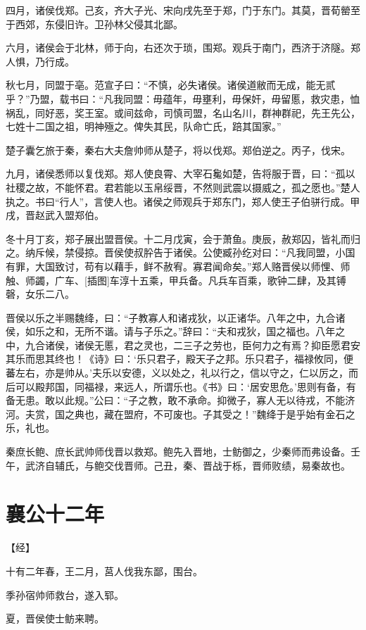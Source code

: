 \documentclass[a4paper,12pt,UTF8,twoside]{ctexbook}
\begin{document}
四月，诸侯伐郑。己亥，齐大子光、宋向戌先至于郑，门于东门。其莫，晋荀罃至于西郊，东侵旧许。卫孙林父侵其北鄙。

六月，诸侯会于北林，师于向，右还次于琐，围郑。观兵于南门，西济于济隧。郑人惧，乃行成。

秋七月，同盟于亳。范宣子曰：“不慎，必失诸侯。诸侯道敝而无成，能无贰乎？”乃盟，载书曰：“凡我同盟：毋蕴年，毋壅利，毋保奸，毋留慝，救灾患，恤祸乱，同好恶，奖王室。或间兹命，司慎司盟，名山名川，群神群祀，先王先公，七姓十二国之祖，明神殛之。俾失其民，队命亡氏，踣其国家。”

楚子囊乞旅于秦，秦右大夫詹帅师从楚子，将以伐郑。郑伯逆之。丙子，伐宋。

九月，诸侯悉师以复伐郑。郑人使良霄、大宰石毚如楚，告将服于晋，曰：“孤以社稷之故，不能怀君。君若能以玉帛绥晋，不然则武震以摄威之，孤之愿也。”楚人执之。书曰“行人”，言使人也。诸侯之师观兵于郑东门，郑人使王子伯骈行成。甲戌，晋赵武入盟郑伯。

冬十月丁亥，郑子展出盟晋侯。十二月戊寅，会于萧鱼。庚辰，赦郑囚，皆礼而归之。纳斥候，禁侵掠。晋侯使叔肸告于诸侯。公使臧孙纥对曰：“凡我同盟，小国有罪，大国致讨，苟有以藉手，鲜不赦宥。寡君闻命矣。”郑人赂晋侯以师悝、师触、师蠲，广车、[插图]车淳十五乘，甲兵备。凡兵车百乘，歌钟二肆，及其镈磬，女乐二八。

晋侯以乐之半赐魏绛，曰：“子教寡人和诸戎狄，以正诸华。八年之中，九合诸侯，如乐之和，无所不谐。请与子乐之。”辞曰：“夫和戎狄，国之福也。八年之中，九合诸侯，诸侯无慝，君之灵也，二三子之劳也，臣何力之有焉？抑臣愿君安其乐而思其终也！《诗》曰：‘乐只君子，殿天子之邦。乐只君子，福禄攸同，便蕃左右，亦是帅从。’夫乐以安德，义以处之，礼以行之，信以守之，仁以厉之，而后可以殿邦国，同福禄，来远人，所谓乐也。《书》曰：‘居安思危。’思则有备，有备无患。敢以此规。”公曰：“子之教，敢不承命。抑微子，寡人无以待戎，不能济河。夫赏，国之典也，藏在盟府，不可废也。子其受之！”魏绛于是乎始有金石之乐，礼也。

秦庶长鲍、庶长武帅师伐晋以救郑。鲍先入晋地，士鲂御之，少秦师而弗设备。壬午，武济自辅氏，与鲍交伐晋师。己丑，秦、晋战于栎，晋师败绩，易秦故也。

\chapter{襄公十二年}


【经】

十有二年春，王二月，莒人伐我东鄙，围台。

季孙宿帅师救台，遂入郓。

夏，晋侯使士鲂来聘。
\end{document}
